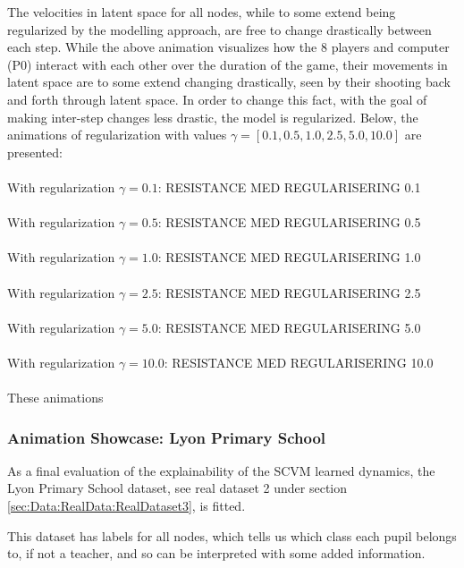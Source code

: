 The velocities in latent space for all nodes, while to some extend being regularized by the modelling approach, are free to change drastically between each step.
While the above animation visualizes how the 8 players and computer (P0) interact with each other over the duration of the game, their movements in latent space are to some extend changing drastically, seen by their shooting back and forth through latent space.
In order to change this fact, with the goal of making inter-step changes less drastic, the model is regularized.
Below, the animations of regularization with values $\gamma = [0.1, 0.5, 1.0, 2.5, 5.0, 10.0]$ are presented:
\\\\
With regularization $\gamma = 0.1$:
RESISTANCE MED REGULARISERING 0.1
\\\\
With regularization $\gamma = 0.5$:
RESISTANCE MED REGULARISERING 0.5
\\\\
With regularization $\gamma = 1.0$:
RESISTANCE MED REGULARISERING 1.0
\\\\
With regularization $\gamma = 2.5$:
RESISTANCE MED REGULARISERING 2.5
\\\\
With regularization $\gamma = 5.0$:
RESISTANCE MED REGULARISERING 5.0
\\\\
With regularization $\gamma = 10.0$:
RESISTANCE MED REGULARISERING 10.0
\\\\
These animations

\subsubsection{Animation Showcase: Lyon Primary School}
\label{sec:ResearchQuestion3:Lyon}

As a final evaluation of the explainability of the SCVM learned dynamics, the Lyon Primary School dataset, see real dataset 2 under section \ref{sec:Data:RealData:RealDataset3}, is fitted.

This dataset has labels for all nodes, which tells us which class each pupil belongs to, if not a teacher, and so can be interpreted with some added information.

